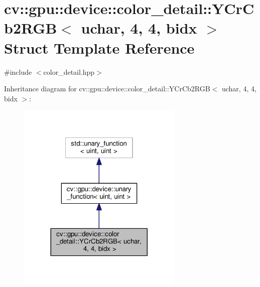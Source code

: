 \hypertarget{structcv_1_1gpu_1_1device_1_1color__detail_1_1YCrCb2RGB_3_01uchar_00_014_00_014_00_01bidx_01_4}{\section{cv\-:\-:gpu\-:\-:device\-:\-:color\-\_\-detail\-:\-:Y\-Cr\-Cb2\-R\-G\-B$<$ uchar, 4, 4, bidx $>$ Struct Template Reference}
\label{structcv_1_1gpu_1_1device_1_1color__detail_1_1YCrCb2RGB_3_01uchar_00_014_00_014_00_01bidx_01_4}
}


{\ttfamily \#include $<$color\-\_\-detail.\-hpp$>$}



Inheritance diagram for cv\-:\-:gpu\-:\-:device\-:\-:color\-\_\-detail\-:\-:Y\-Cr\-Cb2\-R\-G\-B$<$ uchar, 4, 4, bidx $>$\-:\nopagebreak
\begin{figure}[H]
\begin{center}
\leavevmode
\includegraphics[width=224pt]{structcv_1_1gpu_1_1device_1_1color__detail_1_1YCrCb2RGB_3_01uchar_00_014_00_014_00_01bidx_01_4__inherit__graph}
\end{center}
\end{figure}


